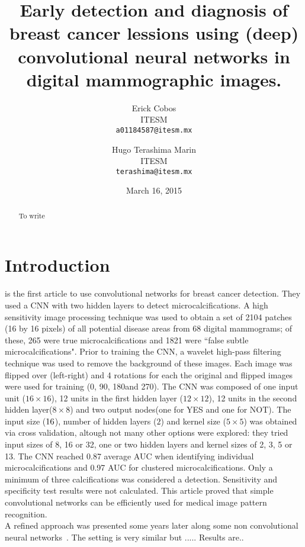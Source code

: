 \documentclass{report} %
\begin{document}
 

\author{Erick Cobos \\  ITESM\\ \texttt{a01184587@itesm.mx} \and Hugo Terashima Marin \\  ITESM \\ \texttt{terashima@itesm.mx}}
\title{Early detection and diagnosis of breast cancer lessions using (deep) convolutional neural networks in digital mammographic images.}
\date{March 16, 2015}
\maketitle

\begin{abstract}
To write
\end{abstract}


\chapter{Introduction}
\cite{Lo1995} is the first article to use convolutional networks for breast cancer detection. They used a CNN with two hidden layers to detect microcalcifications. A high sensitivity image processing technique was used to obtain a set of 2104 patches (16 by 16 pixels) of all potential disease areas from 68 digital mammograms; of these, 265 were true microcalcifications and 1821 were ``false subtle microcalcifications". Prior to training the CNN, a wavelet high-pass filtering technique was used to remove the background of these images. Each image was flipped over (left-right) and 4 rotations for each the original and flipped images were used for training (0\textdegree, 90\textdegree, 180\textdegree and 270\textdegree). The CNN was composed of one input unit ($16\times16$), 12 units in the first hidden layer ($12\times12$), 12 units in the second hidden layer($8\times 8$) and two output nodes(one for YES and one for NOT). The input size ($16\time16$), number of hidden layers ($2$) and kernel size ($5\times5$) was obtained via cross validation, altough not many other options were explored: they tried input sizes of 8, 16 or 32, one or two hidden layers and kernel sizes of 2, 3, 5 or 13. The CNN reached 0.87 average AUC when identifying individual microcalcifications and 0.97 AUC for clustered microcalcifications. Only a minimum of three calcifications was considered a detection. Sensitivity and specificity test results were not calculated. This article proved that simple convolutional networks can be efficiently used for medical image pattern recognition.
\\
A refined approach was presented some years later along some non convolutional neural networks~\cite{Lo1998}. The setting is very similar but ..... Results are..



\end{document}
